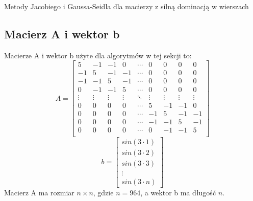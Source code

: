 \documentclass{article}
\begin{document}
\begin{section}{Metody Jacobiego i Gaussa-Seidla dla macierzy z silną dominacją w wierszach}
    \label{sec:1}
    \subsection{Macierz A i wektor b}
    Macierze A i wektor b użyte dla algorytmów w tej sekcji to:
    \begin{equation}
        A = \begin{bmatrix}
            5 & -1 & -1 & 0 & \cdots & 0 & 0 & 0 & 0 \\
            -1 & 5 & -1 & -1 & \cdots & 0 & 0 & 0 & 0 \\
            -1 & -1 & 5 & -1 & \cdots & 0 & 0 & 0 & 0 \\
            0 & -1 & -1 & 5 & \cdots & 0 & 0 & 0 & 0 \\
            \vdots & \vdots & \vdots & \vdots & \ddots & \vdots & \vdots & \vdots & \vdots \\
            0 & 0 & 0 & 0 & \cdots & 5 & -1 & -1 & 0 \\
            0 & 0 & 0 & 0 & \cdots & -1 & 5 & -1 & -1 \\
            0 & 0 & 0 & 0 & \cdots & -1 & -1 & 5 & -1 \\
            0 & 0 & 0 & 0 & \cdots & 0 & -1 & -1 & 5 \\
        \end{bmatrix}
    \end{equation}
    \begin{equation}
        b = \begin{bmatrix}
            sin(3 \cdot 1) \\
            sin(3 \cdot 2) \\
            sin(3 \cdot 3) \\
            \vdots \\
            sin(3 \cdot n)
        \end{bmatrix}
    \end{equation}
    Macierz A ma rozmiar $n \times n$, gdzie $n = 964$, a wektor b ma długość $n$.
    

\end{section}
\end{document}
